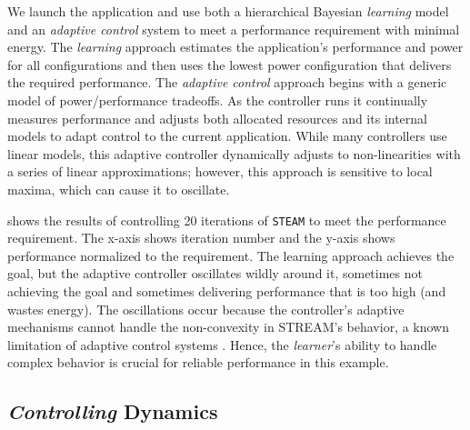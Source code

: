 We launch the application and use both a hierarchical Bayesian
\emph{learning} model \cite{LEO} and an \emph{adaptive control} system
\cite{POET} to meet a performance requirement with minimal energy.
The \emph{learning} approach estimates the application's performance
and power for all configurations and then uses the lowest power
configuration that delivers the required performance.  The
\emph{adaptive control} approach begins with a generic model of
power/performance tradeoffs.  As the controller runs it continually
measures performance and adjusts both allocated resources and its
internal models to adapt control to the current application.  While
many controllers use linear models, this adaptive controller
dynamically adjusts to non-linearities with a series of linear
approximations; however, this approach is sensitive to local maxima,
which can cause it to oscillate.

 shows the results of controlling 20
iterations of \texttt{STEAM} to meet the performance requirement.  The
x-axis shows iteration number and the y-axis shows performance
normalized to the requirement.  The learning approach achieves the
goal, but the adaptive controller oscillates wildly around it,
sometimes not achieving the goal and sometimes delivering performance
that is too high (and wastes energy). The oscillations occur because
the controller's adaptive mechanisms cannot handle the non-convexity
in STREAM's behavior, a known limitation of adaptive control systems
\cite{LEO,ICSE2014}.  Hence, the \emph{learner}'s ability to handle
complex behavior is crucial for reliable performance in this example.


\subsection{\emph{Controlling} Dynamics}



